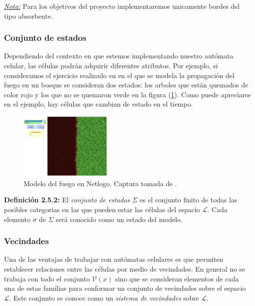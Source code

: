 \underline{\textit{Nota:}} Para los objetivos del proyecto implementaremos unicamente bordes del tipo absorbente.

\subsubsection{Conjunto de estados}

Dependiendo del contexto en que estemos implementando nuestro autómata celular, las células podrán adquirir diferentes atributos. Por ejemplo, si consideramos el ejercicio realizado en  \cite{NetLogoFireModel} en el que se modela la propagación del fuego en un bosque se consideran dos estados: los arboles que están quemados de color rojo y los que no se quemaron verde en la figura (\ref{fig:Fuego Netlogo}). Como puede apreciarse en el ejemplo, hay células que cambian de estado en el tiempo.

\begin{figure}[h]
  \centering
    \includegraphics[width=0.4\textwidth]{Imagenes/netlogoEx1.PNG}
  \caption{Modelo del fuego en Netlogo. Captura tomada de \cite{NetLogoFireModel}.}
  \label{fig:Fuego Netlogo}
\end{figure}

\textbf{Definición 2.5.2:} El \textit{conjunto de estados} $\Sigma$ es el conjunto finito de todas las posibles categorias en las que pueden estar las células del espacio $\mathcal{L}$. Cada elemento $\sigma$ de $\Sigma$ será conocido como un estado del modelo.

\subsubsection{Vecindades}

Una de las ventajas de trabajar con autómatas celulares es que permiten establecer relaciones entre las células por medio de vecindades. En general no se trabaja con todo el conjunto $\mathcal{V}(x)$ sino que se consideran elementos de cada una de estas familias para conformar un conjunto de vecindades sobre el espacio $\mathcal{L}$. Este conjunto se conoce como un \textit{sistema de vecindades} sobre $\mathcal{L}$.

